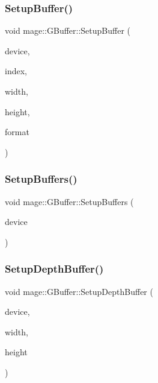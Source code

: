 \subsubsection{\texorpdfstring{Setup\+Buffer()}{SetupBuffer()}}
{\footnotesize\ttfamily void mage\+::\+G\+Buffer\+::\+Setup\+Buffer (\begin{DoxyParamCaption}\item[{I\+D3\+D11\+Device2 $\ast$}]{device,  }\item[{\hyperlink{namespacemage_af2b398bf98eb10351f49cad73fe2cc73}{u32}}]{index,  }\item[{\hyperlink{namespacemage_af2b398bf98eb10351f49cad73fe2cc73}{u32}}]{width,  }\item[{\hyperlink{namespacemage_af2b398bf98eb10351f49cad73fe2cc73}{u32}}]{height,  }\item[{D\+X\+G\+I\+\_\+\+F\+O\+R\+M\+AT}]{format }\end{DoxyParamCaption})\hspace{0.3cm}{\ttfamily [private]}}

\hypertarget{structmage_1_1_g_buffer_a5b0d4c4b0e29afad8524d11f66a5ff3d}{}\label{structmage_1_1_g_buffer_a5b0d4c4b0e29afad8524d11f66a5ff3d} 
\subsubsection{\texorpdfstring{Setup\+Buffers()}{SetupBuffers()}}
{\footnotesize\ttfamily void mage\+::\+G\+Buffer\+::\+Setup\+Buffers (\begin{DoxyParamCaption}\item[{I\+D3\+D11\+Device2 $\ast$}]{device }\end{DoxyParamCaption})\hspace{0.3cm}{\ttfamily [private]}}

\hypertarget{structmage_1_1_g_buffer_acae80f295e232a9ce10554516b0e337e}{}\label{structmage_1_1_g_buffer_acae80f295e232a9ce10554516b0e337e} 
\subsubsection{\texorpdfstring{Setup\+Depth\+Buffer()}{SetupDepthBuffer()}}
{\footnotesize\ttfamily void mage\+::\+G\+Buffer\+::\+Setup\+Depth\+Buffer (\begin{DoxyParamCaption}\item[{I\+D3\+D11\+Device2 $\ast$}]{device,  }\item[{\hyperlink{namespacemage_af2b398bf98eb10351f49cad73fe2cc73}{u32}}]{width,  }\item[{\hyperlink{namespacemage_af2b398bf98eb10351f49cad73fe2cc73}{u32}}]{height }\end{DoxyParamCaption})\hspace{0.3cm}{\ttfamily [private]}}

